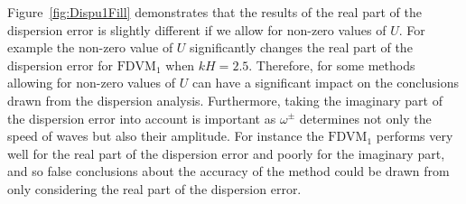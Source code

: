 Figure~\ref{fig:Dispu1Fill} demonstrates that the results of the real part of the dispersion error  is slightly different if we allow for non-zero values of $U$. For example the non-zero value of $U$ significantly changes the real part of the dispersion error for $\text{FDVM}_1$ when $kH = 2.5$. Therefore, for some methods allowing for non-zero values of $U$ can have a significant impact on the conclusions drawn from the dispersion analysis. Furthermore, taking the imaginary part of the dispersion error into account is important as $\omega^\pm$ determines not only the speed of waves but also their amplitude. For instance the $\text{FDVM}_1$ performs very well for the real part of the dispersion error and poorly for the imaginary part, and so false conclusions about the accuracy of the method could be drawn from only considering the real part of the dispersion error.
